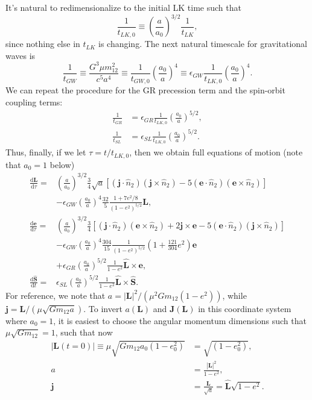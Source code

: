 \documentclass[11pt,
        usenames, %
        dvipsnames %
    ]{article}
\newcommand*{\rd}[2]{\frac{\mathrm{d}#1}{\mathrm{d}#2}}
\newcommand*{\bm}[1]{\boldsymbol{\mathbf{#1}}}
\newcommand*{\abs}[1]{\left|#1\right|}
\newcommand*{\p}[1]{\left(#1\right)}
\newcommand*{\s}[1]{\left[#1\right]}
\begin{document}
It's natural to redimensionalize to the initial LK time such that
\begin{equation}
    \frac{1}{t_{LK, 0}} \equiv \p{\frac{a}{a_0}}^{3/2}\frac{1}{t_{LK}},
\end{equation}
since nothing else in $t_{LK}$ is changing. The next natural timescale for
gravitational waves is
\begin{equation}
    \frac{1}{t_{GW}} \equiv \frac{G^3 \mu m_{12}^2}{c^5a^4}
        \equiv \frac{1}{t_{GW, 0}} \p{\frac{a_0}{a}}^4
        \equiv \epsilon_{GW} \frac{1}{t_{LK, 0}} \p{\frac{a_0}{a}}^4.
\end{equation}
We can repeat the procedure for the GR precession term and the spin-orbit
coupling terms:
\begin{align}
    \frac{1}{t_{GR}} &= \epsilon_{GR}\frac{1}{t_{LK, 0}}
        \p{\frac{a_0}{a}}^{5/2},\\
    \frac{1}{t_{SL}} &= \epsilon_{SL}\frac{1}{t_{LK, 0}}
        \p{\frac{a_0}{a}}^{5/2}.
\end{align}
Thus, finally, if we let $\tau = t / t_{LK, 0}$, then we obtain full equations
of motion (note that $a_0 = 1$ below)
\begin{align}
    \rd{\bm{L}}{\tau} ={}& \p{\frac{a}{a_0}}^{3/2} \frac{3}{4}\sqrt{a}\s{
            \p{\bm{j} \cdot \hat{n}_2} \p{\bm{j} \times \hat{n}_2}
            - 5\p{\bm{e} \cdot \hat{n}_2}\p{\bm{e} \times \hat{n}_2}
            }\nonumber\\
        &- \epsilon_{GW}\p{\frac{a_0}{a}}^4
            \frac{32}{5} \frac{1 + 7e^2/8}{\p{1 - e^2}^{5/2}}\bm{L},\\
    \rd{\bm{e}}{\tau} ={}& \p{\frac{a}{a_0}}^{3/2} \frac{3}{4}\s{
            \p{\bm{j} \cdot \hat{n}_2} \p{\bm{e} \times \hat{n}_2}
            + 2\bm{j} \times \bm{e}
            - 5\p{\bm{e} \cdot \hat{n}_2}\p{\bm{j} \times \hat{n}_2}
            }\nonumber\\
        &-\epsilon_{GW}\p{\frac{a_0}{a}}^4
            \frac{304}{15} \frac{1}{\p{1 - e^2}^{5/2}}\p{1 + \frac{121}{304}
                e^2}\bm{e}\nonumber\\
        &+ \epsilon_{GR}\p{\frac{a_0}{a}}^{5/2}\frac{1}{1 - e^2}
            \hat{\bm{L}} \times \bm{e},\\
    \rd{\hat{\bm{S}}}{t} ={}&
        \epsilon_{SL}\p{\frac{a_0}{a}}^{5/2}\frac{1}{1 - e^2}
        \hat{\bm{L}} \times \hat{\bm{S}}.
\end{align}
For reference, we note that $a = \abs{\bm{L}}^2 / \p{\mu^2 Gm_{12}\p{1 -
e^2}}$, while $\bm{j} = \bm{L} / \p{\mu\sqrt{Gm_{12}a}}$. To invert $a(\bm{L})$
and $\bm{J}\p{\bm{L}}$ in this coordinate system where $a_0 = 1$, it is easiest
to choose the angular momentum dimensions such that $\mu \sqrt{Gm_{12}} = 1$,
such that now
\begin{align}
    \abs{\bm{L}\p{t = 0}} \equiv \mu \sqrt{Gm_{12}a_0\p{1 - e_0^2}}
        &= \sqrt{\p{1 - e_0^2}},\\
    a &= \frac{\abs{\bm{L}}^2}{1 - e^2},\\
    \bm{j} &= \frac{\bm{L}}{\sqrt{a}} = \hat{\bm{L}}\sqrt{1 - e^2}.
\end{align}
\end{document}
